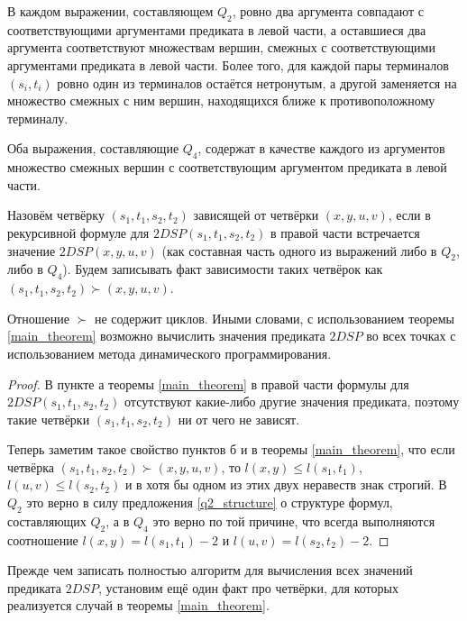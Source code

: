 \begin{proposition} \label{q2_structure}
В каждом выражении, составляющем $Q_2$, ровно два аргумента совпадают с соответствующими аргументами предиката в левой части, а оставшиеся два аргумента соответствуют множествам вершин, смежных с соответствующими аргументами предиката в левой части. Более того, для каждой пары терминалов $(s_i, t_i)$ ровно один из терминалов остаётся нетронутым, а другой заменяется на множество смежных с ним вершин, находящихся ближе к противоположному терминалу.
\end{proposition}

\begin{proposition}
Оба выражения, составляющие $Q_4$, содержат в качестве каждого из аргументов множество смежных вершин с соответствующим аргументом предиката в левой части. 
\end{proposition}

Назовём четвёрку $(s_1, t_1, s_2, t_2)$ зависящей от четвёрки $(x, y, u, v)$, если в рекурсивной формуле для $2DSP(s_1, t_1, s_2, t_2)$ в правой части встречается значение $2DSP(x, y, u, v)$ (как составная часть одного из выражений либо в $Q_2$, либо в $Q_4$). Будем записывать факт зависимости таких четвёрок как $(s_1, t_1, s_2, t_2) \succ (x, y, u, v)$.

\begin{proposition}
Отношение $\succ$ не содержит циклов. Иными словами, с использованием теоремы \ref{main_theorem} возможно вычислить значения предиката $2DSP$ во всех точках с использованием метода динамического программирования.
\end{proposition}
\begin{proof}
В пункте а теоремы \ref{main_theorem} в правой части формулы для $2DSP(s_1, t_1, s_2, t_2)$ отсутствуют какие-либо другие значения предиката, поэтому такие четвёрки $(s_1, t_1, s_2, t_2)$ ни от чего не зависят.

Теперь заметим такое свойство пунктов б и в теоремы \ref{main_theorem}, что если четвёрка $(s_1, t_1, s_2, t_2) \succ (x, y, u, v)$, то $l(x, y) \leq l(s_1, t_1)$, $l(u, v) \leq l(s_2, t_2)$ и в хотя бы одном из этих двух неравеств знак строгий. В $Q_2$ это верно в силу предложения \ref{q2_structure} о структуре формул, составляющих $Q_2$, а в $Q_4$ это верно по той причине, что всегда выполняются соотношение $l(x, y) = l(s_1, t_1) - 2$ и $l(u, v) = l(s_2, t_2) - 2$.
\end{proof}

Прежде чем записать полностью алгоритм для вычисления всех значений предиката $2DSP$, установим ещё один факт про четвёрки, для которых реализуется случай в теоремы \ref{main_theorem}.

